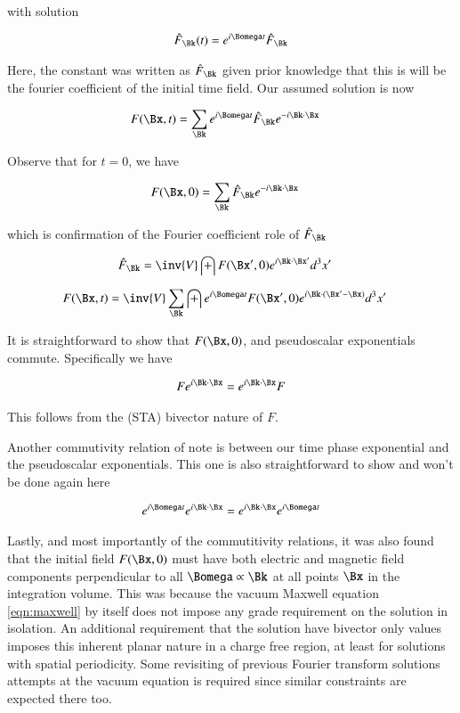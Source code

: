 \documentclass{article}
\begin{document}
with solution

\begin{align}
\hat{F}_{\Bk}(t) = e^{i \Bomega t} \hat{F}_{\Bk}
\end{align}

Here, the constant was written as $\hat{F}_{\Bk}$ given prior knowledge that this is will be the fourier coefficient of the
initial time field.  Our assumed solution is now

\begin{align}
F(\Bx,t) &= \sum_{\Bk} e^{i \Bomega t} \hat{F}_{\Bk} e^{-i \Bk \cdot \Bx} 
\end{align}

Observe that for $t = 0$, we have

\begin{align*}
F(\Bx,0) &= \sum_{\Bk} \hat{F}_{\Bk} e^{-i \Bk \cdot \Bx} 
\end{align*}

which is confirmation of the Fourier coefficient role of $\hat{F}_{\Bk}$

\begin{align}
\hat{F}_{\Bk} &= \inv{V} \int F(\Bx', 0) e^{ i \Bk \cdot \Bx' } d^3 x'
\end{align}

\begin{align}\label{eqn:solutionFromInitialConditions}
F(\Bx,t) &= \inv{V} \sum_{\Bk} \int e^{i \Bomega t} F(\Bx', 0) e^{i \Bk \cdot (\Bx'-\Bx) } d^3 x'
\end{align}

It is straightforward to show that $F(\Bx, 0)$, and pseudoscalar exponentials commute.  Specifically we have

\begin{align}
F e^{ i \Bk \cdot \Bx } = e^{ i \Bk \cdot \Bx } F
\end{align}

This follows from the (STA) bivector nature of $F$.

Another commutivity relation of note is between our time phase exponential and the pseudoscalar exponentials.  This one is also straightforward to show
and won't be done again here

\begin{align}
e^{ i \Bomega t} e^{ i \Bk \cdot \Bx } = e^{ i \Bk \cdot \Bx } e^{ i \Bomega t} 
\end{align}

Lastly, and most importantly of the commutitivity relations,
it was also found that the initial field $F(\Bx,0)$ must have both electric and magnetic field components perpendicular to all $\Bomega \propto \Bk$ at all points
$\Bx$ in the integration volume.  
This was because the vacuum Maxwell equation \ref{eqn:maxwell} by itself does not impose any grade requirement on the solution in isolation.  An
additional requirement that the solution have bivector only values imposes this inherent planar nature in a charge free region, at least for solutions
with spatial periodicity.  Some revisiting of previous Fourier transform solutions attempts at the vacuum equation is required since similar constraints are
expected there too.
\end{document}
